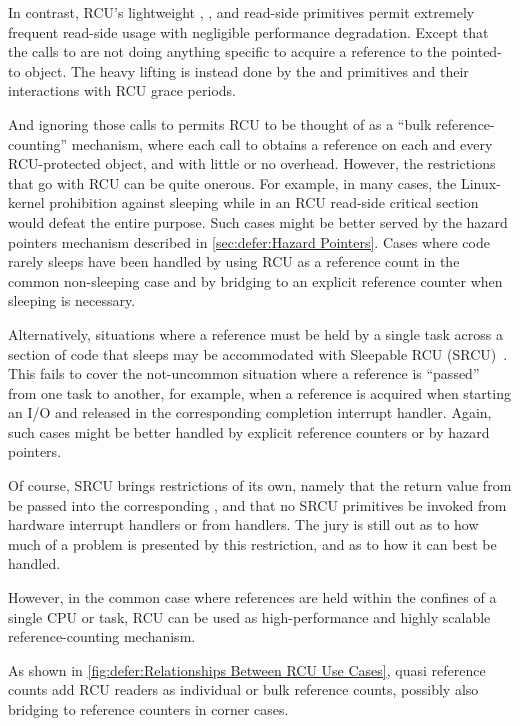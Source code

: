 In contrast, RCU's lightweight ,
, and  read-side primitives
permit extremely frequent read-side usage with negligible performance
degradation.
Except that the calls to  are not doing anything
specific to acquire a reference to the pointed-to object.
The heavy lifting is instead done by the  and
 primitives and their interactions with RCU
grace periods.

And ignoring those calls to  permits RCU to be
thought of as a ``bulk reference-counting'' mechanism, where each call
to  obtains a reference on each and every RCU-protected
object, and with little or no overhead.
However, the restrictions that go with RCU can be quite onerous.
For example, in many cases, the Linux-kernel prohibition against
sleeping while in an RCU read-side critical section would defeat the
entire purpose.
Such cases might be better served by the hazard pointers mechanism
described in \cref{sec:defer:Hazard Pointers}.
Cases where code rarely sleeps have been handled by using RCU as a
reference count in the common non-sleeping case and by bridging
to an explicit reference counter when sleeping is necessary.

Alternatively, situations where a reference must be held by a single task
across a section of code that sleeps may be accommodated with Sleepable
RCU (SRCU)~\cite{PaulEMcKenney2006c}.
This fails to cover the not-uncommon situation where a reference is ``passed''
from one task to another, for example, when a reference is acquired
when starting an I/O and released in the corresponding completion
interrupt handler.
Again, such cases might be better handled by explicit reference counters
or by hazard pointers.

Of course, SRCU brings restrictions of its own, namely that the
return value from  be passed into the
corresponding , and that no SRCU primitives
be invoked from hardware interrupt handlers or from 
handlers.
The jury is still out as to how much of a problem is presented by
this restriction, and as to how it can best be handled.

However, in the common case where references are held within the confines
of a single CPU or task, RCU can be used as high-performance and highly
scalable reference-counting mechanism.

As shown in \cref{fig:defer:Relationships Between RCU Use Cases},
quasi reference counts add RCU readers as individual or bulk
reference counts, possibly also bridging to reference counters
in corner cases.

